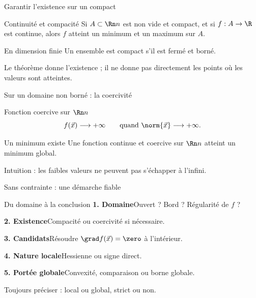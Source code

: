 \begin{frame}[t]{Garantir l’existence sur un compact}
\coursanalyse
\begin{theoreme}{Continuité et compacité}
Si $A\subset\Rn n$ est non vide et compact, et si $f:A\to\R$ est continue, alors $f$ atteint un minimum et un maximum sur $A$.
\end{theoreme}
\begin{cours}{En dimension finie}
Un ensemble est compact s’il est fermé et borné.
\end{cours}\vfill Le théorème donne l’existence ; il ne donne pas directement les points où les valeurs sont atteintes.
\end{frame}

\begin{frame}[t]{Sur un domaine non borné : la coercivité}
\coursanalyse
\begin{notion}{Fonction coercive sur $\Rn n$}
\[f(\vec x)\longrightarrow+\infty\qquad\text{quand }\norm{\vec x}\longrightarrow+\infty.\]
\end{notion}
\begin{theoreme}{Un minimum existe}
Une fonction continue et coercive sur $\Rn n$ atteint un minimum global.
\end{theoreme}\vfill Intuition : les faibles valeurs ne peuvent pas s’échapper à l’infini.
\end{frame}

\begin{frame}[t]{Sans contrainte : une démarche fiable}
\coursanalyse
\begin{cours}{Du domaine à la conclusion}
\textbf{1. Domaine}\quad Ouvert ? Bord ? Régularité de $f$ ?
\medskip\par\textbf{2. Existence}\quad Compacité ou coercivité si nécessaire.
\medskip\par\textbf{3. Candidats}\quad Résoudre $\grad f(\vec x)=\zero$ à l’intérieur.
\medskip\par\textbf{4. Nature locale}\quad Hessienne ou signe direct.
\medskip\par\textbf{5. Portée globale}\quad Convexité, comparaison ou borne globale.
\end{cours}\vfill Toujours préciser : local ou global, strict ou non.
\end{frame}

